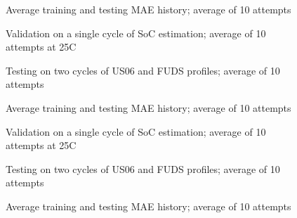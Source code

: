 \begin{figure*}[htbp]
    \centering
    \begin{subfigure}[b]{0.325\textwidth}
        \centering
        
        \caption{Average training and testing MAE history; average of 10 attempts}
    \end{subfigure}
    \hfill
    \begin{subfigure}[b]{0.325\textwidth}
        \centering
        
        \caption{Validation on a single cycle of SoC estimation; average of 10 attempts at 25\textdegree{}C}
    \end{subfigure}
    \hfill
    \begin{subfigure}[b]{0.325\textwidth}
        \centering
        
        \caption{Testing on two cycles of US06 and FUDS profiles; average of 10 attempts}
        \label{subfig:Model-2res-DSTvsFUDS}
    \end{subfigure}
    \begin{subfigure}[b]{0.325\textwidth}
        \centering
        
        \caption{Average training and testing MAE history; average of 10 attempts}
    \end{subfigure}
    \hfill
    \begin{subfigure}[b]{0.325\textwidth}
        \centering
        
        \caption{Validation on a single cycle of SoC estimation; average of 10 attempts at 25\textdegree{}C}
    \end{subfigure}
    \hfill
    \begin{subfigure}[b]{0.325\textwidth}
        \centering
        
        \caption{Testing on two cycles of US06 and FUDS profiles; average of 10 attempts}
    \end{subfigure}
    \begin{subfigure}[b]{0.325\textwidth}
        \centering
        
        \caption{Average training and testing MAE history; average of 10 attempts}

\end{subfigure}
\end{figure*}
